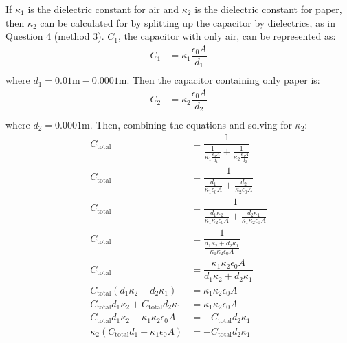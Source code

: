 \documentclass [12pt, letterpaper, twoside] {article}
\begin{document}
\begin{enumerate}
  If \(\kappa_{1}\) is the dielectric constant for air and \(\kappa_{2}\) is the dielectric constant for paper, then \(\kappa_{2}\) can be calculated for by splitting up the capacitor by dielectrics, as in Question 4 (method 3). \(C_{1}\), the capacitor with only air, can be represented as:
  \begin{equation*}
    \begin{split}
      C_{1} &= \kappa_{1}\dfrac{\epsilon_{0}A}{d_{1}} \\
    \end{split}
  \end{equation*} 
  where \(d_{1} = 0.01 \text{m} - 0.0001 \text{m}\). Then the capacitor containing only paper is:
  \begin{equation*}
    \begin{split}
      C_{2} &= \kappa_{2}\dfrac{\epsilon_{0}A}{d_{2}} \\
    \end{split}
  \end{equation*}
  where \(d_{2} = 0.0001 \text{m}\). Then, combining the equations and solving for \(\kappa_{2}\):
  \begin{equation}
    \begin{split}
      C_{\text{total}} &= \dfrac{1}{\tfrac{1}{\kappa_{1}\tfrac{\epsilon_{0}A}{d_{1}}} + \tfrac{1}{\kappa_{2}\tfrac{\epsilon_{0}A}{d_{2}}}} \\
      C_{\text{total}} &= \dfrac{1}{\tfrac{d_{1}}{\kappa_{1}\epsilon_{0}A} + \tfrac{d_{2}}{\kappa_{2}\epsilon_{0}A}} \\
      C_{\text{total}} &= \dfrac{1}{\tfrac{d_{1}\kappa_{2}}{\kappa_{1}\kappa_{2}\epsilon_{0}A} + \tfrac{d_{2}\kappa_{1}}{\kappa_{1}\kappa_{2}\epsilon_{0}A}} \\
      C_{\text{total}} &= \dfrac{1}{\tfrac{d_{1}\kappa_{2} + d_{2}\kappa_{1}}{\kappa_{1}\kappa_{2}\epsilon_{0}A}} \\
      C_{\text{total}} &= \dfrac{\kappa_{1}\kappa_{2}\epsilon_{0}A}{d_{1}\kappa_{2} + d_{2}\kappa_{1}} \\
      C_{\text{total}}(d_{1}\kappa_{2} + d_{2}\kappa_{1}) &= \kappa_{1}\kappa_{2}\epsilon_{0}A \\
      C_{\text{total}}d_{1}\kappa_{2} + C_{\text{total}}d_{2}\kappa_{1} &=\kappa_{1}\kappa_{2}\epsilon_{0}A \\
      C_{\text{total}}d_{1}\kappa_{2} - \kappa_{1}\kappa_{2}\epsilon_{0}A &= -C_{\text{total}}d_{2}\kappa_{1} \\
      \kappa_{2}(C_{\text{total}}d_{1} - \kappa_{1}\epsilon_{0}A) &= -C_{\text{total}}d_{2}\kappa_{1} \\

\end{split}
\end{equation}
\end{enumerate}
\end{document}
